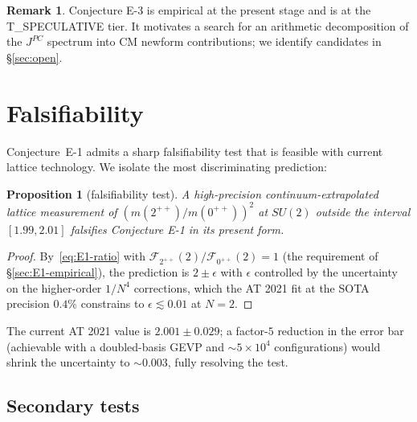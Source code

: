 \documentclass[11pt,a4paper]{amsart}
\newtheorem{proposition}[theorem]{Proposition}
\theoremstyle{definition}
\newtheorem{remark}[theorem]{Remark}
\begin{document}
\begin{remark}
Conjecture E-3 is empirical at the present stage and is at the T\_SPECULATIVE
tier. It motivates a search for an arithmetic decomposition of the
$J^{PC}$ spectrum into CM newform contributions; we identify candidates in
\S\ref{sec:open}.
\end{remark}

\section{Falsifiability}\label{sec:falsif}

Conjecture~E-1 admits a sharp falsifiability test that is feasible with current
lattice technology. We isolate the most discriminating prediction:

\begin{proposition}[falsifiability test]\label{prop:falsif}
A high-precision continuum-extrapolated lattice measurement of
$(m(2^{++})/m(0^{++}))^{2}$ at $SU(2)$ outside the interval $[1.99, 2.01]$
falsifies Conjecture E-1 in its present form.
\end{proposition}

\begin{proof}
By~\eqref{eq:E1-ratio} with $\mathcal{F}_{2^{++}}(2) / \mathcal{F}_{0^{++}}(2) = 1$
(the requirement of \S\ref{sec:E1-empirical}), the prediction is
$2 \pm \epsilon$ with $\epsilon$ controlled by the uncertainty on the higher-order
$1/N^{4}$ corrections, which the AT 2021 fit at the SOTA precision $0.4\%$
constrains to $\epsilon \lesssim 0.01$ at $N = 2$.
\end{proof}

The current AT 2021 value is $2.001 \pm 0.029$; a factor-$5$ reduction in the
error bar (achievable with a doubled-basis GEVP and $\sim 5 \times 10^{4}$
configurations) would shrink the uncertainty to $\sim 0.003$, fully resolving the
test.

\subsection{Secondary tests}
\end{document}
